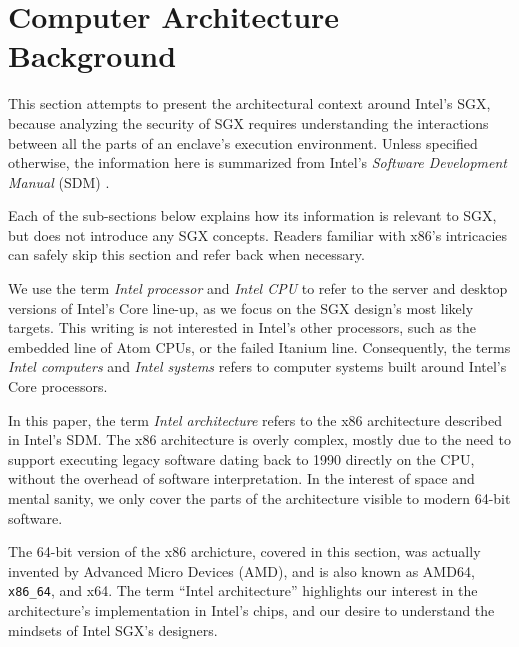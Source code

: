\section{Computer Architecture Background}
\label{sec:architecture_background}

This section attempts to present the architectural context around Intel's SGX,
because analyzing the security of SGX requires understanding the interactions
between all the parts of an enclave's execution environment. Unless specified
otherwise, the information here is summarized from Intel's
\textit{Software Development Manual} (SDM) \cite{intel2015sdm}.

Each of the sub-sections below explains how its information is relevant to SGX,
but does not introduce any SGX concepts. Readers familiar with x86's
intricacies can safely skip this section and refer back when necessary.

We use the term \textit{Intel processor} and \textit{Intel CPU} to refer to the
server and desktop versions of Intel's Core line-up, as we focus on the SGX
design's most likely targets. This writing is not interested in Intel's other
processors, such as the embedded line of Atom CPUs, or the failed Itanium line.
Consequently, the terms \textit{Intel computers} and \textit{Intel systems}
refers to computer systems built around Intel's Core processors.

In this paper, the term \textit{Intel architecture} refers to the x86
architecture described in Intel's SDM. The x86 architecture is overly complex,
mostly due to the need to support executing legacy software dating back to 1990
directly on the CPU, without the overhead of software interpretation. In the
interest of space and mental sanity, we only cover the parts of the
architecture visible to modern 64-bit software.

The 64-bit version of the x86 archicture, covered in this section, was actually
invented by Advanced Micro Devices (AMD), and is also known as AMD64,
\texttt{x86\_64}, and x64. The term ``Intel architecture'' highlights our
interest in the architecture's implementation in Intel's chips, and our desire
to understand the mindsets of Intel SGX's designers.



















